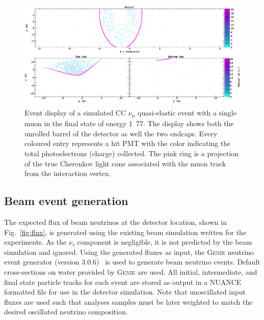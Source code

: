 \begin{figure} %
    \includegraphics[width=\textwidth]{diagrams/4-chips/sim_event.pdf}
    \caption[Event display of a simulated beam CC $\nu_{\mu}$ \chipsfive event]
    {Event display of a simulated CC $\nu_{\mu}$ quasi-elastic event with a single muon in the
        final state of energy \unit{1.77}{\GeV}. The display shows both the unrolled barrel of the
        \chipsfive detector as well the two endcaps. Every coloured entry represents a hit PMT
        with the color indicating the total photoelectrons (charge) collected. The pink ring is a
        projection of the true Cherenkov light cone associated with the muon track from the
        interaction vertex.}
    \label{fig:sim_event}
\end{figure}

\subsection{Beam event generation} %
\label{sec:chips_monte_carlo_beam} %

The expected flux of beam neutrinos at the \chipsfive detector location, shown in
Fig.~\ref{fig:flux}, is generated using the existing beam simulation written for the \numi
experiments. As the $\nu_{\tau}$ component is negligible, it is not predicted by the beam
simulation and ignored. Using the generated fluxes as input, the \textsc{Genie} neutrino event
generator (version 3.0.6)~\cite{andreopoulos2009, andreopoulos2015} is used to generate beam
neutrino events. Default cross-sections on water provided by \textsc{Genie} are used. All initial,
intermediate, and final state particle tracks for each event are stored as output in a NUANCE
formatted file for use in the detector simulation. Note that unoscillated input fluxes are used
such that analyses samples must be later weighted to match the desired oscillated neutrino
composition.

